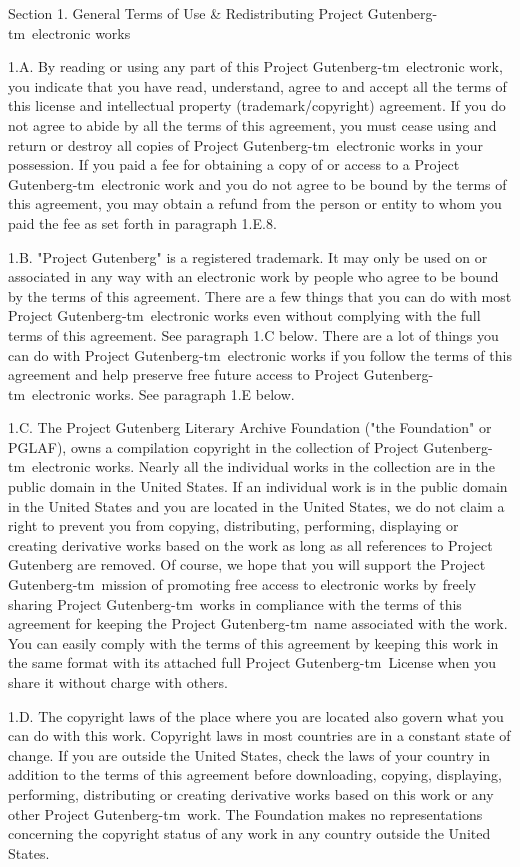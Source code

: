 \documentclass[11pt]{book}
\newcommand{\pgtm}{Project \mbox{Gutenberg-tm}}
\begin{document}
{\medskip\noindent Section 1.  General Terms of Use \& Redistributing \pgtm\ electronic works

\smallskip\noindent 1.A.  By reading or using any part of this \pgtm\ 
electronic work, you indicate that you have read, understand, agree to
and accept all the terms of this license and intellectual property
(trademark/copyright) agreement.  If you do not agree to abide by all
the terms of this agreement, you must cease using and return or destroy
all copies of \pgtm\ electronic works in your possession.
If you paid a fee for obtaining a copy of or access to a
\pgtm\ electronic work and you do not agree to be bound by the
terms of this agreement, you may obtain a refund from the person or
entity to whom you paid the fee as set forth in paragraph 1.E.8.

\smallskip\noindent 1.B.  "Project Gutenberg" is a registered trademark.  It may only be
used on or associated in any way with an electronic work by people who
agree to be bound by the terms of this agreement.  There are a few
things that you can do with most \pgtm\ electronic works
even without complying with the full terms of this agreement.  See
paragraph 1.C below.  There are a lot of things you can do with
\pgtm\ electronic works if you follow the terms of this agreement
and help preserve free future access to \pgtm\ electronic
works.  See paragraph 1.E below.

\smallskip\noindent 1.C.  The Project Gutenberg Literary Archive Foundation ("the Foundation"
or PGLAF), owns a compilation copyright in the collection of
\pgtm\ electronic works.  Nearly all the individual works in the
collection are in the public domain in the United States.  If an
individual work is in the public domain in the United States and you are
located in the United States, we do not claim a right to prevent you from
copying, distributing, performing, displaying or creating derivative
works based on the work as long as all references to Project Gutenberg
are removed.  Of course, we hope that you will support the
\pgtm\ mission of promoting free access to electronic works by
freely sharing \pgtm\ works in compliance with the terms of
this agreement for keeping the \pgtm\ name associated with
the work.  You can easily comply with the terms of this agreement by
keeping this work in the same format with its attached full
\pgtm\ License when you share it without charge with others.

\smallskip\noindent 1.D.  The copyright laws of the place where you are located also govern
what you can do with this work.  Copyright laws in most countries are in
a constant state of change.  If you are outside the United States, check
the laws of your country in addition to the terms of this agreement
before downloading, copying, displaying, performing, distributing or
creating derivative works based on this work or any other
\pgtm\ work.  The Foundation makes no representations concerning
the copyright status of any work in any country outside the United
States.

}
\end{document}
